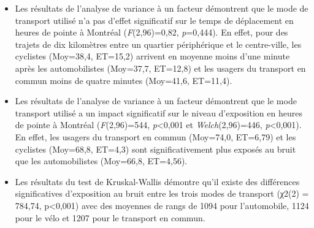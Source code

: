 \documentclass[
  11pt,
  french,
]{book}
\begin{document}
\begin{itemize}
\item
  Les résultats de l'analyse de variance à un facteur démontrent que le mode de transport utilisé n'a pas d'effet significatif sur le temps de déplacement en heures de pointe à Montréal (\emph{F}(2,96)=0,82, \emph{p}=0,444). En effet, pour des trajets de dix kilomètres entre un quartier périphérique et le centre-ville, les cyclistes (Moy=38,4, ET=15,2) arrivent en moyenne moins d'une minute après les automobilistes (Moy=37,7, ET=12,8) et les usagers du transport en commun moins de quatre minutes (Moy=41,6, ET=11,4).
\item
  Les résultats de l'analyse de variance à un facteur démontrent que le mode transport utilisé a un impact significatif sur le niveau d'exposition en heures de pointe à Montréal (\emph{F}(2,96)=544, \emph{p}\textless0,001 et \emph{Welch}(2,96)=446, \emph{p}\textless0,001). En effet, les usagers du transport en commun (Moy=74,0, ET=6,79) et les cyclistes (Moy=68,8, ET=4,3) sont significativement plus exposés au bruit que les automobilistes (Moy=66,8, ET=4,56).
\item
  Les résultats du test de Kruskal-Wallis démontre qu'il existe des différences significatives d'exposition au bruit entre les trois modes de transport (χ2(2) = 784,74, p\textless0,001) avec des moyennes de rangs de 1094 pour l'automobile, 1124 pour le vélo et 1207 pour le transport en commun.
\end{itemize}
\end{document}
